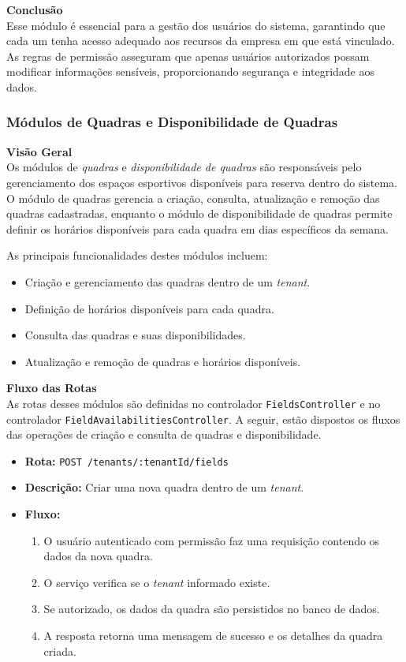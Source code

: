 \noindent\textbf{Conclusão} \\
Esse módulo é essencial para a gestão dos usuários do sistema, garantindo que cada um tenha acesso adequado aos recursos da empresa em que está vinculado. As regras de permissão asseguram que apenas usuários autorizados possam modificar informações sensíveis, proporcionando segurança e integridade aos dados.

\subsubsection{Módulos de Quadras e Disponibilidade de Quadras}\label{subsubsec:modulos_quadras_disponibilidade_quadras}

\noindent\textbf{Visão Geral}\\
Os módulos de \textit{quadras} e \textit{disponibilidade de quadras} são responsáveis pelo gerenciamento dos espaços esportivos disponíveis para reserva dentro do sistema. O módulo de quadras gerencia a criação, consulta, atualização e remoção das quadras cadastradas, enquanto o módulo de disponibilidade de quadras permite definir os horários disponíveis para cada quadra em dias específicos da semana.

As principais funcionalidades destes módulos incluem:

\begin{itemize}
    \item Criação e gerenciamento das quadras dentro de um \textit{tenant}.
    \item Definição de horários disponíveis para cada quadra.
    \item Consulta das quadras e suas disponibilidades.
    \item Atualização e remoção de quadras e horários disponíveis.
\end{itemize}

\noindent\textbf{Fluxo das Rotas}\\
As rotas desses módulos são definidas no controlador \texttt{FieldsController} e no controlador \texttt{FieldAvailabilitiesController}.
A seguir, estão dispostos os fluxos das operações de criação e consulta de quadras e disponibilidade.

\begin{itemize}
    \item \textbf{Rota:} \texttt{POST /tenants/:tenantId/fields}
    \item \textbf{Descrição:} Criar uma nova quadra dentro de um \textit{tenant}.
    \item \textbf{Fluxo:}
    \begin{enumerate}
        \item O usuário autenticado com permissão faz uma requisição contendo os dados da nova quadra.
        \item O serviço verifica se o \textit{tenant} informado existe.
        \item Se autorizado, os dados da quadra são persistidos no banco de dados.
        \item A resposta retorna uma mensagem de sucesso e os detalhes da quadra criada.
    \end{enumerate}
\end{itemize}

